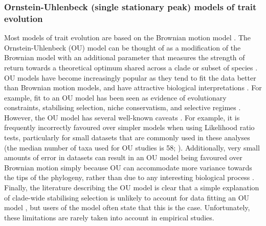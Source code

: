 \documentclass[a4paper,12pt]{article}
\begin{document}
\subsubsection{Ornstein-Uhlenbeck (single stationary peak) models of trait evolution}
Most models of trait evolution are based on the Brownian motion model \citep{cavalli1967,felsenstein1973maximum}.
The Ornstein-Uhlenbeck (OU) model can be thought of as a modification of the Brownian model with an additional parameter that measures the strength of return towards a theoretical optimum shared across a clade or subset of species \citep{hansen1997stabilizing,Butler:2004aa}.
OU models have become increasingly popular as they tend to fit the data better than Brownian motion models, and have attractive biological interpretations \citep{cooper2016}.
For example, fit to an OU model has been seen as evidence of evolutionary constraints, stabilising selection, niche conservatism, and selective regimes \citep{Wiens:2010aa,beaulieu2012modeling,christin2013anatomical,mahler2013exceptional}.
However, the OU model has several well-known caveats \citep[see][]{ives2010phylogenetic,boettiger2012your,hansen2012interpreting,ho2013asymptotic,ho2014intrinsic}. 
For example, it is frequently incorrectly favoured over simpler models when using Likelihood ratio tests, particularly for small datasets that are commonly used in these analyses (the median number of taxa used for OU studies is 58; \citealp{cooper2016}). 
Additionally, very small amounts of error in datasets can result in an OU model being favoured over Brownian motion simply because OU can accommodate more variance towards the tips of the phylogeny, rather than due to any interesting biological process \citep{boettiger2012your,pennell2015model}.
Finally, the literature describing the OU model is clear that a simple explanation of clade-wide stabilising selection is unlikely to account for data fitting an OU model \citep[e.g.][]{hansen1997stabilizing,hansen2005assessing}, but users of the model often state that this is the case.
Unfortunately, these limitations are rarely taken into account in empirical studies.
\end{document}
